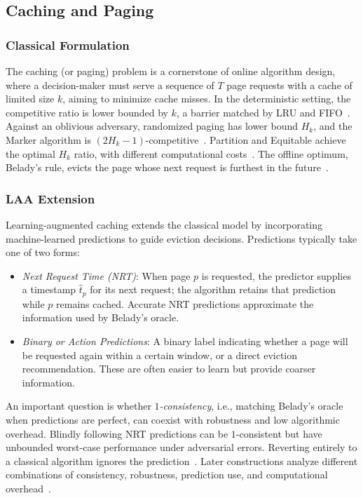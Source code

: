 \documentclass[acmsmall,screen,nonacm]{acmart}
\theoremstyle{acmdefinition}%
\begin{document}
\subsection{Caching and Paging}
\label{subsec:caching}

\subsubsection{Classical Formulation}
The caching (or paging) problem is a cornerstone of online algorithm design, where a decision-maker must serve a sequence of $T$ page requests with a cache of limited size $k$, aiming to minimize cache misses. In the deterministic setting, the competitive ratio is lower bounded by $k$, a barrier matched by LRU and FIFO~\cite{sleator1985amortized}. Against an oblivious adversary, randomized paging has lower bound $H_k$, and the Marker algorithm is $(2H_k-1)$-competitive~\cite{fiat1991competitive}. Partition and Equitable achieve the optimal $H_k$ ratio, with different computational costs~\cite{mcgeoch1991strongly,achlioptas2000competitive}. The offline optimum, Belady's rule, evicts the page whose next request is furthest in the future~\cite{belady1966study}.

\subsubsection{LAA Extension}
Learning-augmented caching extends the classical model by incorporating machine-learned predictions to guide eviction decisions. Predictions typically take one of two forms:
\begin{itemize}
    \item \emph{Next Request Time (NRT)}: When page $p$ is requested, the predictor supplies a timestamp $\hat{t}_p$ for its next request; the algorithm retains that prediction while $p$ remains cached. Accurate NRT predictions approximate the information used by Belady's oracle.
    \item \emph{Binary or Action Predictions}: A binary label indicating whether a page will be requested again within a certain window, or a direct eviction recommendation. These are often easier to learn but provide coarser information.
\end{itemize}
An important question is whether \emph{$1$-consistency}, i.e., matching Belady's oracle when predictions are perfect, can coexist with robustness and low algorithmic overhead. Blindly following NRT predictions can be $1$-consistent but have unbounded worst-case performance under adversarial errors. Reverting entirely to a classical algorithm ignores the prediction~\cite{lykouris2018competitive,lykouris2021competitive,rohatgi2020near}. Later constructions analyze different combinations of consistency, robustness, prediction use, and computational overhead~\cite{wei2020better}.
\end{document}
